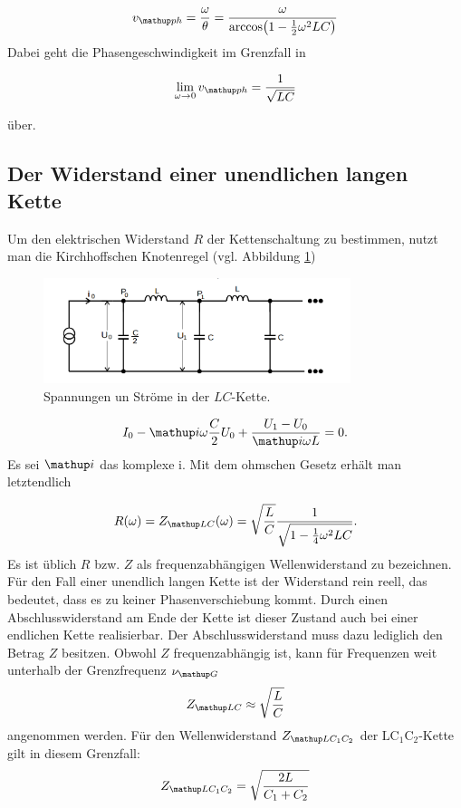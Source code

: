 \begin{equation}
\label{eq:phasen_esc}
v\ua{ph}=\frac{\omega}{\theta}=\frac{\omega}{\arccos\!\left(1-\frac{1}{2}\omega^2LC\right)}
\end{equation}
Dabei geht die Phasengeschwindigkeit im Grenzfall in

\begin{equation*}
\lim_{\omega\to 0}v\ua{ph}=\frac{1}{\sqrt{LC}}
\end{equation*}

über.
\subsection{Der Widerstand einer unendlichen langen Kette}

Um den elektrischen Widerstand $R$ der Kettenschaltung zu bestimmen,
nutzt man die Kirchhoffschen Knotenregel (vgl. Abbildung \ref{fig:bestimmung_impe}) %
\begin{figure}
  \centering
  \includegraphics[width=0.8\textwidth]{bilder/eigenimpendanz.png}
  \caption{Spannungen un Ströme in der $LC$-Kette.\cite{anleitung356}}
  \label{fig:bestimmung_impe}
\end{figure}
\begin{equation*}
I_0 - \map{i}\omega\frac{C}{2}U_0+\frac{U_1-U_0}{\map{i}\omega L}=0.
\end{equation*}
Es sei $\map{i}$ das komplexe i. %
Mit dem ohmschen Gesetz erhält man letztendlich %

\begin{equation}
R(\omega)=Z\ua{LC}(\omega)=\sqrt{\frac{L}{C}}\frac{1}{\sqrt{1-\frac{1}{4}\omega^2LC}}.
\label{eq: wellenwiderstand_LC}
\end{equation}
Es ist üblich $R$ bzw. $Z$ als frequenzabhängigen Wellenwiderstand zu bezeichnen.
Für den Fall einer unendlich langen Kette ist der Widerstand rein reell, das bedeutet, %
dass es zu keiner Phasenverschiebung kommt.
Durch einen Abschlusswiderstand am Ende der Kette ist dieser Zustand auch bei einer endlichen Kette
realisierbar. Der Abschlusswiderstand muss dazu lediglich den Betrag $Z$ besitzen.
Obwohl $Z$ frequenzabhängig ist, kann für Frequenzen weit unterhalb der Grenzfrequenz $\nu\ua{G}$
\begin{equation*}
Z\ua{LC}\approx \sqrt{\frac{L}{C}}
\end{equation*}
angenommen werden. Für den Wellenwiderstand $Z\ua{LC_1C_2}$ der $\mathup{LC_1C_2}$-Kette gilt
in diesem Grenzfall:
\begin{equation}
  Z\ua{LC_1C_2} = \sqrt{\frac{2L}{C_1 + C_2}}
  \label{eq: Z_LC_1C_2}
\end{equation}

